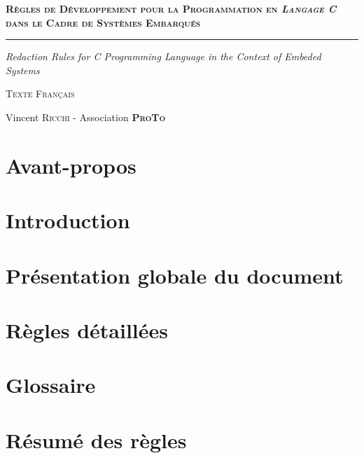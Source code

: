 \documentclass[a4paper, titlepage]{article}
\begin{document}
\begin{titlepage}
  \begin{flushleft}\huge\bfseries\scshape
    Règles de Développement pour la Programmation en \textit{Langage C} dans le Cadre de Systèmes Embarqués
  \end{flushleft}
  \hrule
  \begin{flushright}\LARGE\slshape
    Redaction Rules for C Programming Language in the Context of Embeded Systems
  \end{flushright}
  \begin{center}
  	\Large\textsc{Texte Français}
  \end{center}  
  \begin{center}
    Vincent \textsc{Ricchi} - Association \textsc{\textbf{ProTo}}
  \end{center}
\end{titlepage}


\part*{Avant-propos}


\tableofcontents

\pagebreak

\part{Introduction}


\part{Présentation globale du document}


\part{Règles détaillées}








\appendix

\pagebreak

\part*{Glossaire}


\pagebreak

\part*{Résumé des règles}

\end{document}
